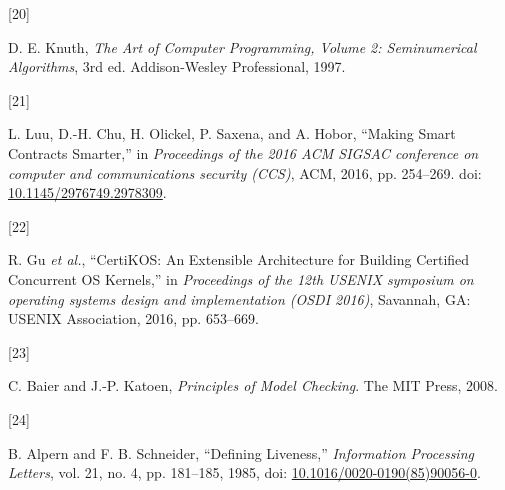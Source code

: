 \documentclass[
  english,
  onecolumn]{article}
\newlength{\cslhangindent}
\newlength{\csllabelwidth}
\newenvironment{CSLReferences}[2] %
 {\begin{list}{}{%
  \setlength{\itemindent}{0pt}
  \setlength{\leftmargin}{0pt}
  \setlength{\parsep}{0pt}
  \ifodd #1
   \setlength{\leftmargin}{\cslhangindent}
   \setlength{\itemindent}{-1\cslhangindent}
  \fi
  \setlength{\itemsep}{#2\baselineskip}}}
 {\end{list}}
\newcommand{\CSLLeftMargin}[1]{\parbox[t]{\csllabelwidth}{\strut#1\strut}}
\newcommand{\CSLRightInline}[1]{\parbox[t]{\linewidth - \csllabelwidth}{\strut#1\strut}}
\begin{document}
\begin{CSLReferences}{0}{0}
\CSLLeftMargin{{[}20{]} }%
\CSLRightInline{D. E. Knuth, \emph{{The Art of Computer Programming,
Volume 2: Seminumerical Algorithms}}, 3rd ed. Addison-Wesley
Professional, 1997.}

\CSLLeftMargin{{[}21{]} }%
\CSLRightInline{L. Luu, D.-H. Chu, H. Olickel, P. Saxena, and A. Hobor,
{``{Making Smart Contracts Smarter},''} in \emph{Proceedings of the 2016
ACM SIGSAC conference on computer and communications security (CCS)},
ACM, 2016, pp. 254--269. doi:
\href{https://doi.org/10.1145/2976749.2978309}{10.1145/2976749.2978309}.}

\CSLLeftMargin{{[}22{]} }%
\CSLRightInline{R. Gu \emph{et al.}, {``{CertiKOS: An Extensible
Architecture for Building Certified Concurrent OS Kernels},''} in
\emph{Proceedings of the 12th USENIX symposium on operating systems
design and implementation (OSDI 2016)}, Savannah, GA: {USENIX}
Association, 2016, pp. 653--669.}

\CSLLeftMargin{{[}23{]} }%
\CSLRightInline{C. Baier and J.-P. Katoen, \emph{{Principles of Model
Checking}}. The MIT Press, 2008.}

\CSLLeftMargin{{[}24{]} }%
\CSLRightInline{B. Alpern and F. B. Schneider, {``{Defining
Liveness},''} \emph{Information Processing Letters}, vol. 21, no. 4, pp.
181--185, 1985, doi:
\href{https://doi.org/10.1016/0020-0190(85)90056-0}{10.1016/0020-0190(85)90056-0}.}

\end{CSLReferences}
\end{document}
